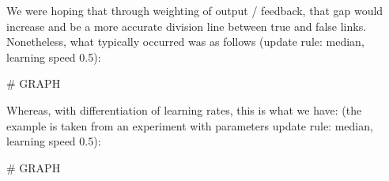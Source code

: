 \documentclass[11pt]{article}
\begin{document}
We were hoping that through weighting of output / feedback, that gap would increase and be a more accurate division line between true and false links. Nonetheless, what typically occurred was as follows (update rule: median, learning speed 0.5):

\# GRAPH

 

Whereas, with differentiation of learning rates, this is what we have:
 (the example is taken from an experiment with parameters update rule: median, learning speed 0.5):


\# GRAPH
\end{document}
